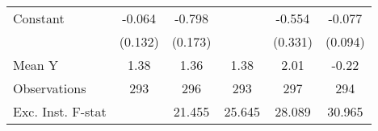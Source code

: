 {\begin{tabular}{l*{5}{c}}
\addlinespace
Constant            &      -0.064         &      -0.798\sym{***}&                     &      -0.554         &      -0.077         \\
                    &     (0.132)         &     (0.173)         &                     &     (0.331)         &     (0.094)         \\
\midrule
Mean Y              &        1.38         &        1.36         &        1.38         &        2.01         &       -0.22         \\
Observations        &         293         &         296         &         293         &         297         &         294         \\
Exc. Inst. F-stat   &                     &      21.455         &      25.645         &      28.089         &      30.965         \\
\bottomrule
\end{tabular}
}
